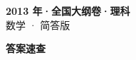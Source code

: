 \documentclass[zihao=-4, a4paper]{ctexart}
\begin{document}
\begin{center}
  {\Large\bfseries 2013 年·全国大纲卷·理科}\\[4pt]
  {\large 数学 · 简答版}
\end{center}
\medskip
{}

\clearpage
{}
\begin{center}{\Large\bfseries 答案速查}\end{center}
\medskip

\end{document}
